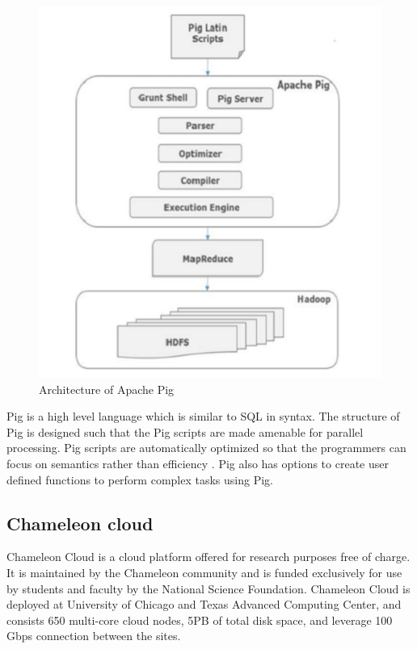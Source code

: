 \documentclass[9pt,twocolumn,twoside]{../../styles/osajnl}
\begin{document}
\begin{figure}[hptb]
\centering
\includegraphics[width=\linewidth]{images/PigArch.PNG}
\caption{ Architecture of Apache Pig \cite{www-opensource}}
\label{fig:Pig}
\end{figure}

Pig is a high level language which is similar to SQL in syntax. The structure of Pig is designed such that the Pig scripts are made amenable for parallel processing. Pig scripts are automatically optimized so that the programmers can focus on semantics rather than efficiency \cite{www-pig-apache}. Pig also has options to create user defined functions to perform complex tasks using Pig.

\subsection{Chameleon cloud}
Chameleon Cloud is a cloud platform offered for research purposes free of charge. It is maintained by the Chameleon community and is funded exclusively for use by students and faculty by the National Science Foundation. Chameleon Cloud is deployed at University of Chicago and Texas Advanced Computing Center, and consists 650 multi-core cloud nodes, 5PB of total disk space, and leverage 100 Gbps connection between the sites. 
\end{document}
